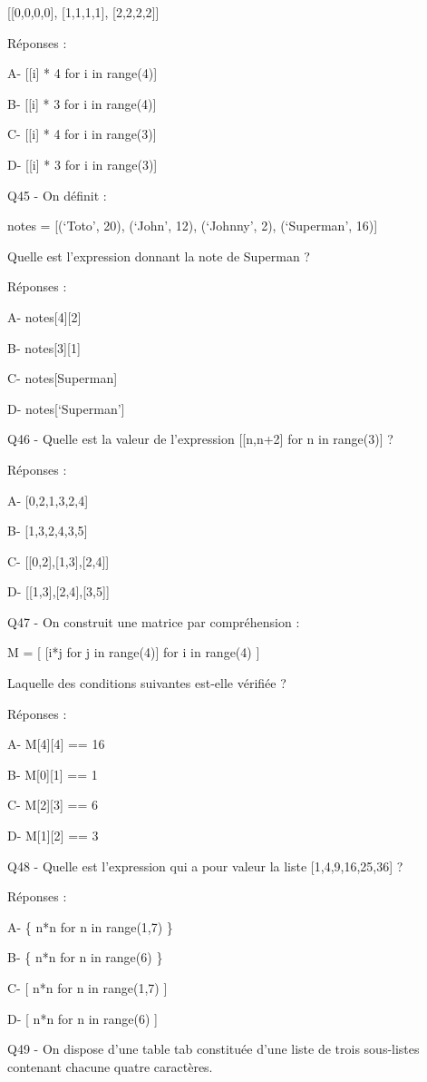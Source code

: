 \documentclass[
]{book}
\begin{document}
{[}{[}0,0,0,0{]}, {[}1,1,1,1{]}, {[}2,2,2,2{]}{]}

Réponses :

A- {[}{[}i{]} * 4 for i in range(4){]}

B- {[}{[}i{]} * 3 for i in range(4){]}

C- {[}{[}i{]} * 4 for i in range(3){]}

D- {[}{[}i{]} * 3 for i in range(3){]}

Q45 - On définit :

notes = {[}(`Toto', 20), (`John', 12), (`Johnny', 2), (`Superman', 16){]}

Quelle est l'expression donnant la note de Superman ?

Réponses :

A- notes{[}4{]}{[}2{]}

B- notes{[}3{]}{[}1{]}

C- notes{[}Superman{]}

D- notes{[}`Superman'{]}

Q46 - Quelle est la valeur de l'expression {[}{[}n,n+2{]} for n in range(3){]} ?

Réponses :

A- {[}0,2,1,3,2,4{]}

B- {[}1,3,2,4,3,5{]}

C- {[}{[}0,2{]},{[}1,3{]},{[}2,4{]}{]}

D- {[}{[}1,3{]},{[}2,4{]},{[}3,5{]}{]}

Q47 - On construit une matrice par compréhension :

M = {[} {[}i*j for j in range(4){]} for i in range(4) {]}

Laquelle des conditions suivantes est-elle vérifiée ?

Réponses :

A- M{[}4{]}{[}4{]} == 16

B- M{[}0{]}{[}1{]} == 1

C- M{[}2{]}{[}3{]} == 6

D- M{[}1{]}{[}2{]} == 3

Q48 - Quelle est l'expression qui a pour valeur la liste {[}1,4,9,16,25,36{]} ?

Réponses :

A- \{ n*n for n in range(1,7) \}

B- \{ n*n for n in range(6) \}

C- {[} n*n for n in range(1,7) {]}

D- {[} n*n for n in range(6) {]}

Q49 - On dispose d'une table tab constituée d'une liste de trois sous-listes contenant chacune quatre caractères.
\end{document}

